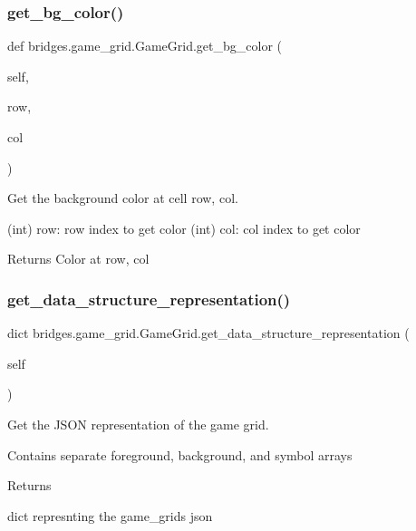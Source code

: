 \subsubsection{\texorpdfstring{get\_bg\_color()}{get\_bg\_color()}}
{\footnotesize\ttfamily def bridges.\+game\+\_\+grid.\+Game\+Grid.\+get\+\_\+bg\+\_\+color (\begin{DoxyParamCaption}\item[{}]{self,  }\item[{int}]{row,  }\item[{int}]{col }\end{DoxyParamCaption})}



Get the background color at cell row, col. 

\begin{DoxyVerb}       (int) row: row index to get color
       (int) col: col index to get color
\end{DoxyVerb}
 \begin{DoxyReturn}{Returns}
Color at row, col 
\end{DoxyReturn}
\mbox{\label{classbridges_1_1game__grid_1_1_game_grid_ac81ba121456b60c2cfe5e96514e78403}} 
\subsubsection{\texorpdfstring{get\_data\_structure\_representation()}{get\_data\_structure\_representation()}}
{\footnotesize\ttfamily  dict bridges.\+game\+\_\+grid.\+Game\+Grid.\+get\+\_\+data\+\_\+structure\+\_\+representation (\begin{DoxyParamCaption}\item[{}]{self }\end{DoxyParamCaption})}



Get the J\+S\+ON representation of the game grid. 

Contains separate foreground, background, and symbol arrays \begin{DoxyReturn}{Returns}


dict represnting the game\+\_\+grids json 
\end{DoxyReturn}
\mbox{\label{classbridges_1_1game__grid_1_1_game_grid_a0a38f422a54e93cfd2816e0051fb8d5a}} 
